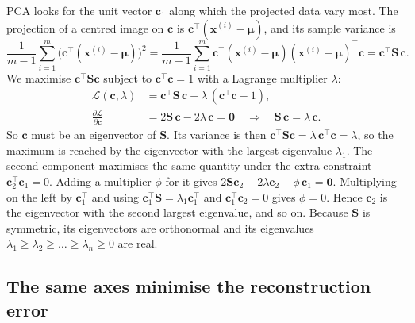 \documentclass[11pt,a4paper]{article}
\newcommand{\x}{\mathbf{x}}
\newcommand{\bmu}{\boldsymbol{\mu}}
\newcommand{\T}{^{\top}}
\begin{document}
PCA looks for the unit vector $\mathbf{c}_1$ along which the projected data vary most. The projection of a centred image on $\mathbf{c}$ is $\mathbf{c}\T(\x^{(i)}-\bmu)$, and its sample variance is
\begin{equation}
\frac{1}{m-1}\sum_{i=1}^{m}\big(\mathbf{c}\T(\x^{(i)}-\bmu)\big)^2
=\frac{1}{m-1}\sum_{i=1}^{m}\mathbf{c}\T(\x^{(i)}-\bmu)(\x^{(i)}-\bmu)\T\mathbf{c}
=\mathbf{c}\T\mathbf{S}\,\mathbf{c}.
\end{equation}
We maximise $\mathbf{c}\T\mathbf{S}\mathbf{c}$ subject to $\mathbf{c}\T\mathbf{c}=1$ with a Lagrange multiplier $\lambda$:
\begin{align}
\mathcal{L}(\mathbf{c},\lambda)&=\mathbf{c}\T\mathbf{S}\,\mathbf{c}-\lambda\,(\mathbf{c}\T\mathbf{c}-1),\\
\frac{\partial\mathcal{L}}{\partial\mathbf{c}}&=2\mathbf{S}\,\mathbf{c}-2\lambda\,\mathbf{c}=\mathbf{0}
\quad\Longrightarrow\quad \mathbf{S}\,\mathbf{c}=\lambda\,\mathbf{c}.
\end{align}
So $\mathbf{c}$ must be an eigenvector of $\mathbf{S}$. Its variance is then $\mathbf{c}\T\mathbf{S}\mathbf{c}=\lambda\,\mathbf{c}\T\mathbf{c}=\lambda$, so the maximum is reached by the eigenvector with the largest eigenvalue $\lambda_1$. The second component maximises the same quantity under the extra constraint $\mathbf{c}_2\T\mathbf{c}_1=0$. Adding a multiplier $\phi$ for it gives $2\mathbf{S}\mathbf{c}_2-2\lambda\mathbf{c}_2-\phi\,\mathbf{c}_1=\mathbf{0}$. Multiplying on the left by $\mathbf{c}_1\T$ and using $\mathbf{c}_1\T\mathbf{S}=\lambda_1\mathbf{c}_1\T$ and $\mathbf{c}_1\T\mathbf{c}_2=0$ gives $\phi=0$. Hence $\mathbf{c}_2$ is the eigenvector with the second largest eigenvalue, and so on. Because $\mathbf{S}$ is symmetric, its eigenvectors are orthonormal and its eigenvalues $\lambda_1\ge\lambda_2\ge\dots\ge\lambda_n\ge 0$ are real.

\subsection{The same axes minimise the reconstruction error}
\end{document}

